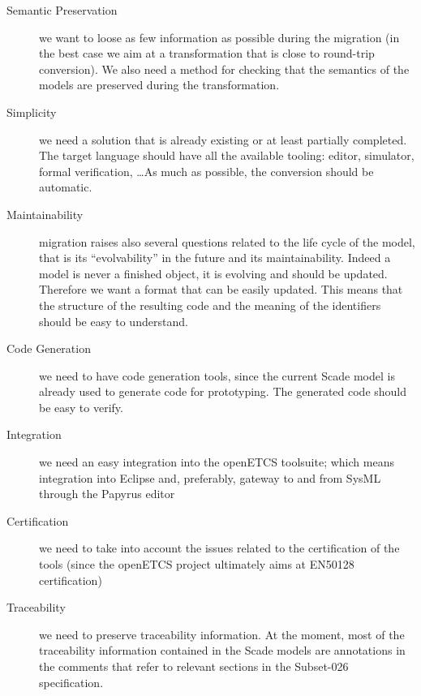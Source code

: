 \documentclass{template/openetcs_report}
\begin{document}
\begin{description}

\item[Semantic Preservation] we want to loose as few information as
  possible during the migration (in the best case we aim at a
  transformation that is close to round-trip conversion). We also need
  a method for checking that the semantics of the models are preserved
  during the transformation.

\item[Simplicity] we need a solution that is already existing or at
  least partially completed. The target language should have all the
  available tooling: editor, simulator, formal verification, \dots As
  much as possible, the conversion should be automatic.

\item[Maintainability] migration raises also several questions related
  to the life cycle of the model, that is its ``evolvability'' in the
  future and its maintainability. Indeed a model is never a finished
  object, it is evolving and should be updated. Therefore we want a
  format that can be easily updated. This means that the structure of
  the resulting code and the meaning of the identifiers should be easy
  to understand.

\item[Code Generation] we need to have code generation tools, since
  the current Scade model is already used to generate code for
  prototyping.  The generated code should be easy to verify.

\item[Integration] we need an easy integration into the openETCS
  toolsuite; which means integration into Eclipse and, preferably,
  gateway to and from SysML through the Papyrus editor

\item[Certification] we need to take into account the issues related
  to the certification of the tools (since the openETCS project
  ultimately aims at EN50128 certification)

\item[Traceability] we need to preserve traceability information. At
  the moment, most of the traceability information contained in the
  Scade models are annotations in the comments that refer to relevant
  sections in the Subset-026 specification.

\end{description}

\end{document}
